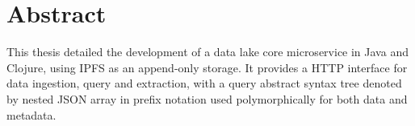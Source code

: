 \chapter{Abstract}
This thesis detailed the development of a data lake core microservice
in Java and Clojure, using IPFS as an append-only storage.  It provides
a HTTP interface for data ingestion, query and extraction, with a query
abstract syntax tree denoted by nested JSON array in prefix notation
used polymorphically for both data and metadata.
